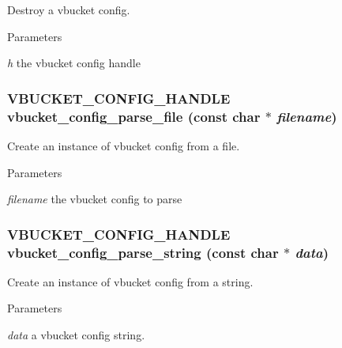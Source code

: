 Destroy a vbucket config. 


\begin{DoxyParams}{Parameters}
\item[{\em h}]the vbucket config handle \end{DoxyParams}
\hypertarget{group___c_d_gab07e7f5741db4e787cee43f1c42fd061}{
\subsubsection[{vbucket\_\-config\_\-parse\_\-file}]{\setlength{\rightskip}{0pt plus 5cm}VBUCKET\_\-CONFIG\_\-HANDLE vbucket\_\-config\_\-parse\_\-file (const char $\ast$ {\em filename})}}
\label{group___c_d_gab07e7f5741db4e787cee43f1c42fd061}


Create an instance of vbucket config from a file. 


\begin{DoxyParams}{Parameters}
\item[{\em filename}]the vbucket config to parse \end{DoxyParams}
\hypertarget{group___c_d_ga9dbcb358df598b59cb4922b951cb817a}{
\subsubsection[{vbucket\_\-config\_\-parse\_\-string}]{\setlength{\rightskip}{0pt plus 5cm}VBUCKET\_\-CONFIG\_\-HANDLE vbucket\_\-config\_\-parse\_\-string (const char $\ast$ {\em data})}}
\label{group___c_d_ga9dbcb358df598b59cb4922b951cb817a}


Create an instance of vbucket config from a string. 


\begin{DoxyParams}{Parameters}
\item[{\em data}]a vbucket config string. \end{DoxyParams}
